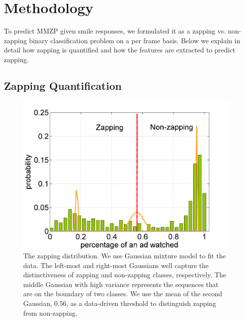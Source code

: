 \documentclass[twoside,leqno,twocolumn]{article}
\begin{document}
\section{Methodology}%
To predict MMZP given smile responses, we formulated it as a zapping vs. non-zapping binary classification problem on a per frame basis. Below we explain in detail how zapping is quantified and how the features are extracted to predict zapping.


\subsection{Zapping Quantification}

\begin{figure}[h]
	\centering
		\includegraphics[width=.85\columnwidth]{fig/ad_len_distr.png}
	\caption{The zapping distribution. We use Gaussian mixture model to fit the data. The left-most and right-most Gaussians well capture the distinctiveness of zapping and non-zapping classes, respectively. The middle Gaussian with high variance represents the sequences that are on the boundary of two classes. We use the mean of the second Gaussian, 0.56, as a data-driven threshold to distinguish zapping from non-zapping.}
	\label{fig:ad_len_distr}
\end{figure}
\end{document}
